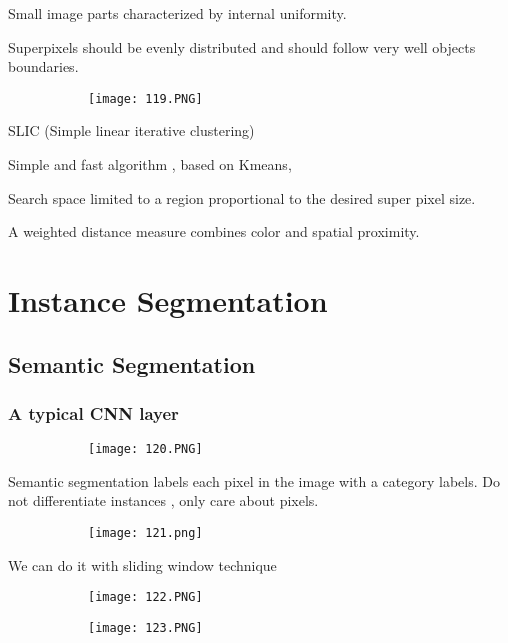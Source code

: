 \documentclass{article}
\begin{document}
Small image parts characterized by internal uniformity.

Superpixels should be evenly distributed and should follow very well objects boundaries.

\begin{figure}[ht!]
  \centering
  \begin{subfigure}[b]{0.5\linewidth}
    \texttt{[image: 119.PNG]}
  \end{subfigure}
\end{figure}

SLIC (Simple linear iterative clustering)

Simple and fast algorithm , based on Kmeans,

Search space limited to a region proportional to the desired super pixel size.

A weighted distance measure combines color and spatial proximity.

\section{Instance Segmentation}

\subsection{Semantic Segmentation}

\subsubsection{A typical CNN layer}

\begin{figure}[ht!]
  \centering
  \begin{subfigure}[b]{0.5\linewidth}
    \texttt{[image: 120.PNG]}
  \end{subfigure}
\end{figure}

Semantic segmentation labels each pixel in the image with a category labels. Do not differentiate instances , only care about pixels.

\begin{figure}[ht!]
  \centering
  \begin{subfigure}[b]{0.5\linewidth}
    \texttt{[image: 121.png]}
  \end{subfigure}
\end{figure}

\vspace{10mm}

We can do it with sliding window technique

\begin{figure}[ht!]
  \centering
  \begin{subfigure}[b]{0.5\linewidth}
    \texttt{[image: 122.PNG]}
  \end{subfigure}
     \begin{subfigure}[b]{0.49\textwidth}
         \centering
         \texttt{[image: 123.PNG]}
     \end{subfigure}
\end{figure}
\end{document}
